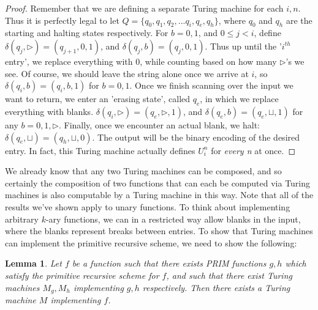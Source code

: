 \documentclass{article}
\theoremstyle{definition}
\theoremstyle{plain}
\theoremstyle{theorem}
\newtheorem{lemma}{Lemma}[section]
\begin{document}
\begin{proof}
    Remember that we are defining a separate Turing machine for each $i,n$. Thus it is perfectly legal to let $Q=\{q_0,q_1,q_2,...q_i,q_e,q_h\}$, where $q_0$ and $q_h$ are the starting and halting states respectively. For $b=0,1$, and $0 \leq j < i$, define $\delta(q_j,\triangleright)=(q_{j+1},0,1)$, and $\delta(q_j,b)=(q_j,0,1)$. Thus up until the '$i^{th}$ entry', we replace everything with 0, while counting based on how many $\triangleright$'s we see. Of course, we should leave the string alone once we arrive at $i$, so $\delta(q_i,b)=(q_i,b,1)$ for $b=0,1$. Once we finish scanning over the input we want to return, we enter an 'erasing state', called $q_e$, in which we replace everything with blanks. $\delta(q_i,\triangleright)=(q_e,\triangleright,1)$, and $\delta(q_e,b)=(q_e,\sqcup,1)$ for any $b=0,1,\triangleright$. Finally, once we encounter an actual blank, we halt: $\delta(q_e,\sqcup)=(q_h,\sqcup,0)$. The output will be the binary encoding of the desired entry. In fact, this Turing machine actually defines $U_i^n$ for \textit{every n} at once.
\end{proof}
We already know that any two Turing machines can be composed, and so certainly the composition of two functions that can each be computed via Turing machines is also computable by a Turing machine in this way.
Note that all of the results we've shown apply to unary functions. To think about implementing arbitrary $k$-ary functions, we can in a restricted way allow blanks in the input, where the blanks represent breaks between entries. To show that Turing machines can implement the primitive recursive scheme, we need to show the following:
\begin{lemma}
    Let $f$ be a function such that there exists PRIM functions $g,h$ which satisfy the primitive recursive scheme for $f$, and such that there exist Turing machines $M_g,M_h$ implementing $g,h$ respectively. Then there exists a Turing machine $M$ implementing $f$.
\end{lemma}
\end{document}
